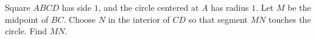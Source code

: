 Square $ABCD$ has side $1$, and the circle centered at $A$ has radius $1$. Let $M$ be the midpoint of $BC$. Choose $N$ in the interior of $CD$ so that segment $MN$ touches the circle. Find $MN$.
